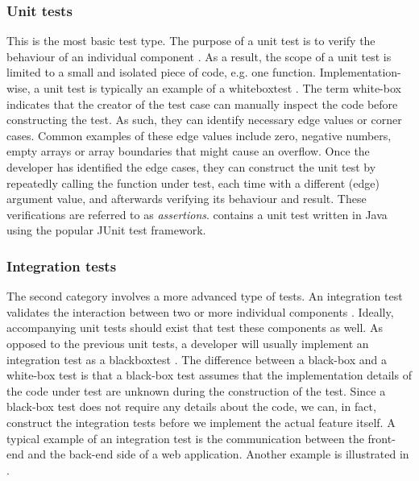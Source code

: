 \subsubsection{Unit tests}
This is the most basic test type. The purpose of a unit test is to verify the behaviour of an individual component \cite{whittaker2000}. As a result, the scope of a unit test is limited to a small and isolated piece of code, e.g. one function. Implementation-wise, a unit test is typically an example of a \gls{whiteboxtest} \cite[p.~12]{6588537}. The term white-box indicates that the creator of the test case can manually inspect the code before constructing the test. As such, they can identify necessary edge values or corner cases. Common examples of these edge values include zero, negative numbers, empty arrays or array boundaries that might cause an overflow. Once the developer has identified the edge cases, they can construct the unit test by repeatedly calling the function under test, each time with a different (edge) argument value, and afterwards verifying its behaviour and result. These verifications are referred to as \emph{assertions}.  contains a unit test written in Java using the popular JUnit test framework.\\
	


\clearpage

\subsubsection{Integration tests}
The second category involves a more advanced type of tests. An integration test validates the interaction between two or more individual components \cite{whittaker2000}. Ideally, accompanying unit tests should exist that test these components as well. As opposed to the previous unit tests, a developer will usually implement an integration test as a \gls{blackboxtest} \cite[p.~6]{6588537}. The difference between a black-box and a white-box test is that a black-box test assumes that the implementation details of the code under test are unknown during the construction of the test. Since a black-box test does not require any details about the code, we can, in fact, construct the integration tests before we implement the actual feature itself. A typical example of an integration test is the communication between the front-end and the back-end side of a web application. Another example is illustrated in .\\
	

